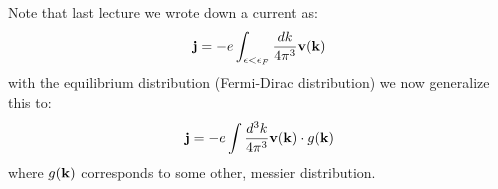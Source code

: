 Note that last lecture we wrote down a current as:
\begin{equation}
    \mathbf{j} = -e\int_{\epsilon < \epsilon_F} \frac{dk}{4\pi^3}\mathbf{v}(\mathbf{k})
\end{equation}
with the equilibrium distribution (Fermi-Dirac distribution) we now generalize this to:
\begin{equation}
    \mathbf{j} = -e\int \frac{d^3k}{4\pi^3}\mathbf{v}(\mathbf{k}) \cdot g(\mathbf{k})
\end{equation}
where $g(\mathbf{k})$ corresponds to some other, messier distribution.
